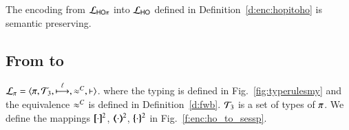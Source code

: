 \begin{theorem}
\label{f:enc:hopitoho}
The encoding from $\mathcal{L}_{\mathsf{HO}\pi}$ into $\mathcal{L}_{\mathsf{HO}}$ 
defined in Definition~\ref{d:enc:hopitoho}
is semantic preserving. 
\end{theorem}

\subsection{From \HO to \sessp}
\label{subsec:HO_to_sessp}

\begin{definition}
\label{d:enc:hopitopi}
$\tyl{L}_{\sessp}=\calc{\sessp}{{\cal{T}}_3}{\hby{\ell}}{\fwb}{\proves}$. 
where the typing is defined in 
Fig.~\ref{fig:typerulesmy} 
and the equivalence $\approx^C$ is defined in Definition~\ref{d:fwb}.
${\cal{T}}_3$ is a set of types of $\pi$.  
%
We define the mappings $[\!\![\cdot]\!\!]^{2}$, $(\!\!\langle\cdot\rangle\!\!)^{2}$, $\{\!\!\{\cdot\}\!\!\}^{2}$
in Fig.~\ref{f:enc:ho_to_sessp}. 
\end{definition}

